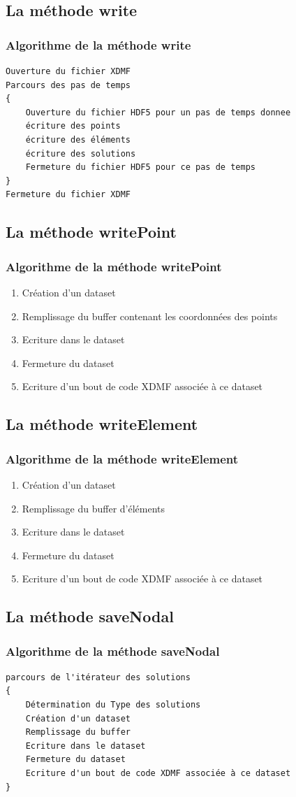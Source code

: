 \documentclass{beamer}
\begin{document}
\subsection{La méthode write}
\begin{frame}[fragile]
\frametitle{Algorithme de la méthode write}
\begin{verbatim} 
Ouverture du fichier XDMF
Parcours des pas de temps 
{
    Ouverture du fichier HDF5 pour un pas de temps donnee
    écriture des points
    écriture des éléments
    écriture des solutions
    Fermeture du fichier HDF5 pour ce pas de temps
}
Fermeture du fichier XDMF
\end{verbatim}
\end{frame}
\subsection{La méthode writePoint}
\begin{frame}[fragile]
\frametitle{Algorithme de la méthode writePoint}
\begin{enumerate} 
\item Création d'un dataset
\item Remplissage du buffer contenant les coordonnées des points 
\item Ecriture dans le dataset
\item Fermeture du dataset
\item Ecriture d'un bout de code XDMF associée à ce dataset
\end{enumerate}
\end{frame}
\subsection{La méthode writeElement}
\begin{frame}[fragile]
\frametitle{Algorithme de la méthode writeElement}
\begin{enumerate} 
\item Création d'un dataset
\item Remplissage du buffer d'éléments 
\item Ecriture dans le dataset
\item Fermeture du dataset
\item Ecriture d'un bout de code XDMF associée à ce dataset
\end{enumerate}
\end{frame}
\subsection{La méthode saveNodal}
\begin{frame}[fragile]
\frametitle{Algorithme de la méthode saveNodal}
\begin{verbatim} 
parcours de l'itérateur des solutions 
{
    Détermination du Type des solutions
    Création d'un dataset
    Remplissage du buffer 
    Ecriture dans le dataset
    Fermeture du dataset
    Ecriture d'un bout de code XDMF associée à ce dataset
}
\end{verbatim}
\end{frame}
\end{document}
